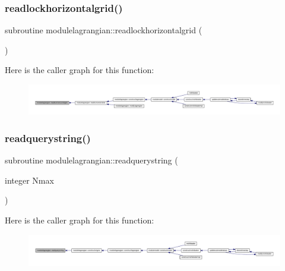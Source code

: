 \subsubsection{\texorpdfstring{readlockhorizontalgrid()}{readlockhorizontalgrid()}}
{\footnotesize\ttfamily subroutine modulelagrangian\+::readlockhorizontalgrid (\begin{DoxyParamCaption}{ }\end{DoxyParamCaption})\hspace{0.3cm}{\ttfamily [private]}}

Here is the caller graph for this function\+:\nopagebreak
\begin{figure}[H]
\begin{center}
\leavevmode
\includegraphics[width=350pt]{namespacemodulelagrangian_a94ace2d6de2898ec24d8cd3f4ccd1292_icgraph}
\end{center}
\end{figure}
\mbox{\label{namespacemodulelagrangian_a1d47ba91199ceabdf0bbe9cc584783b7}} 
\subsubsection{\texorpdfstring{readquerystring()}{readquerystring()}}
{\footnotesize\ttfamily subroutine modulelagrangian\+::readquerystring (\begin{DoxyParamCaption}\item[{integer}]{Nmax }\end{DoxyParamCaption})\hspace{0.3cm}{\ttfamily [private]}}

Here is the caller graph for this function\+:\nopagebreak
\begin{figure}[H]
\begin{center}
\leavevmode
\includegraphics[width=350pt]{namespacemodulelagrangian_a1d47ba91199ceabdf0bbe9cc584783b7_icgraph}
\end{center}
\end{figure}
\mbox{\label{namespacemodulelagrangian_a62c1768ee36cf2fc50c44c595fbf0408}} 
